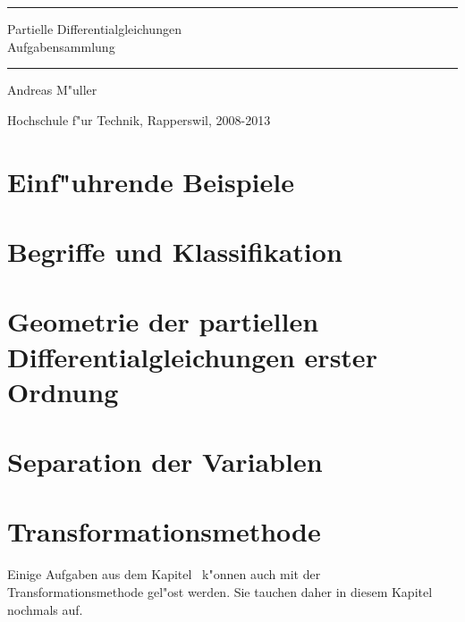 \documentclass[a4paper,12pt]{book}
\begin{document}
\pagestyle{fancy}
\rhead{}
\frontmatter
\newcommand\HRule{\noindent\rule{\linewidth}{1.5pt}}
\begin{titlepage}
\HRule
\vspace*{2pt}
\begin{flushright}
{\Huge
Partielle Differentialgleichungen\\
\bigskip
Aufgabensammlung}
\end{flushright}
\HRule
\begin{flushright}
\vspace{30pt}
\LARGE
Andreas M"uller
\end{flushright}
\begin{center}
Hochschule f"ur Technik, Rapperswil, 2008-2013
\end{center}
\end{titlepage}
\hypersetup{
	colorlinks=true,
	linktoc=all,
	linkcolor=blue
}
\tableofcontents
\newenvironment{beispiel}[1][Beispiel]{%
\begin{proof}[#1]%
\renewcommand{\qedsymbol}{$\bigcirc$}
}{\end{proof}}
\mainmatter


\chapter{Einf"uhrende  Beispiele}

\chapter{Begriffe und Klassifikation}

\chapter{Geometrie der partiellen Differentialgleichungen erster Ordnung}

\chapter{Separation der Variablen\label{chapter:separation}}

\chapter{Transformationsmethode}
Einige Aufgaben aus dem Kapitel~\label{chapter:separation}
k"onnen auch mit der Transformationsmethode gel"ost werden.
Sie tauchen daher in diesem Kapitel nochmals auf.
\bigskip
\end{document}
